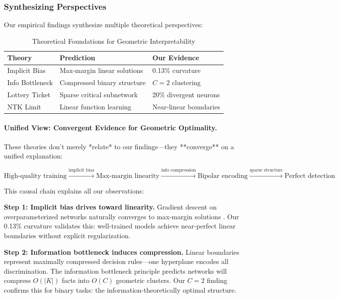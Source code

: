 \documentclass[11pt]{article}
\begin{document}
\subsubsection{Synthesizing Perspectives}

Our empirical findings synthesize multiple theoretical perspectives:

\begin{table}[h]
\centering
\caption{Theoretical Foundations for Geometric Interpretability}
\begin{tabular}{lll}
\toprule
\textbf{Theory} & \textbf{Prediction} & \textbf{Our Evidence} \\
\midrule
Implicit Bias & Max-margin linear solutions & 0.13\% curvature \\
Info Bottleneck & Compressed binary structure & $C=2$ clustering \\
Lottery Ticket & Sparse critical subnetwork & 20\% divergent neurons \\
NTK Limit & Linear function learning & Near-linear boundaries \\
\bottomrule
\end{tabular}
\end{table}

\paragraph{Unified View: Convergent Evidence for Geometric Optimality.}
These theories don't merely *relate* to our findings—they **converge** on a unified explanation:

\begin{equation}
\boxed{\text{High-quality training} \xrightarrow{\text{implicit bias}} \text{Max-margin linearity} \xrightarrow{\text{info compression}} \text{Bipolar encoding} \xrightarrow{\text{sparse structure}} \text{Perfect detection}}
\end{equation}

This causal chain explains all our observations:

\textbf{Step 1: Implicit bias drives toward linearity.}
Gradient descent on overparameterized networks naturally converges to max-margin solutions \citep{soudry2018implicit}. Our 0.13\% curvature validates this: well-trained models achieve near-perfect linear boundaries without explicit regularization.

\textbf{Step 2: Information bottleneck induces compression.}
Linear boundaries represent maximally compressed decision rules—one hyperplane encodes all discrimination. The information bottleneck principle \citep{tishby2015deep} predicts networks will compress $O(|K|)$ facts into $O(C)$ geometric clusters. Our $C=2$ finding confirms this for binary tasks: the information-theoretically optimal structure.
\end{document}
